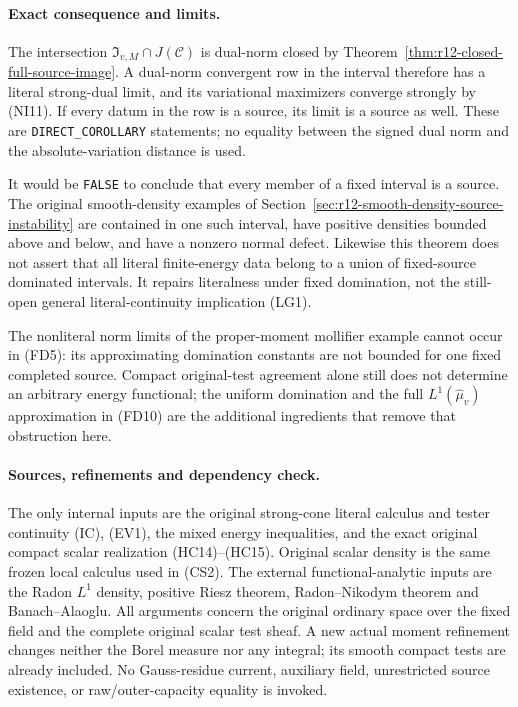 \documentclass[11pt,a4paper]{article}
\numberwithin{equation}{section}
\theoremstyle{definition}
\theoremstyle{remark}
\begin{document}
\paragraph{Exact consequence and limits.}
The intersection
$\mathfrak I_{v,M}\cap J(\mathscr C)$ is dual-norm closed by
Theorem~\ref{thm:r12-closed-full-source-image}. A dual-norm
convergent row in the interval therefore has a literal strong-dual
limit, and its variational maximizers converge strongly by
\textup{(NI11)}. If every datum in the row is a source, its limit
is a source as well. These are \texttt{DIRECT\_COROLLARY}
statements; no equality between the signed dual norm and the
absolute-variation distance is used.

It would be \texttt{FALSE} to conclude that every member of a
fixed interval is a source. The original smooth-density examples
of Section~\ref{sec:r12-smooth-density-source-instability} are
contained in one such interval, have positive densities bounded
above and below, and have a nonzero normal defect. Likewise this
theorem does not assert that all literal finite-energy data belong
to a union of fixed-source dominated intervals. It repairs
literalness under fixed domination, not the still-open general
literal-continuity implication \textup{(LG1)}.

The nonliteral norm limits of the proper-moment mollifier example
cannot occur in \textup{(FD5)}: its approximating domination
constants are not bounded for one fixed completed source. Compact
original-test agreement alone still does not determine an arbitrary
energy functional; the uniform domination and the full
$L^1(\widehat\mu_v)$ approximation in \textup{(FD10)} are the
additional ingredients that remove that obstruction here.

\paragraph{Sources, refinements and dependency check.}
The only internal inputs are the original strong-cone literal
calculus and tester continuity \textup{(IC), (EV1)}, the mixed
energy inequalities, and the exact original compact scalar
realization \textup{(HC14)--(HC15)}. Original scalar density is
the same frozen local calculus used in \textup{(CS2)}. The
external functional-analytic inputs are the Radon $L^1$ density,
positive Riesz theorem, Radon--Nikodym theorem and Banach--Alaoglu.
All arguments concern the original ordinary space over the fixed
field and the complete original scalar test sheaf. A new actual
moment refinement changes neither the Borel measure nor any
integral; its smooth compact tests are already included. No
Gauss-residue current, auxiliary field, unrestricted source
existence, or raw/outer-capacity equality is invoked.
\end{document}
